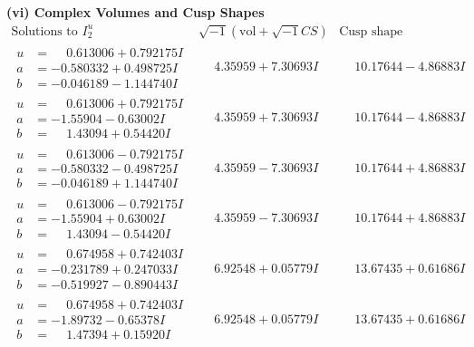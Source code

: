 \documentclass[1p]{elsarticle_modified}
\theoremstyle{definition}
\newcommand{\I}{\sqrt{-1}}
\begin{document}
\newpage\flushleft \textbf{(vi) Complex Volumes and Cusp Shapes}
$$\begin{array}{c|c|c}  
\text{Solutions to }I^u_{2}& \I (\text{vol} + \sqrt{-1}CS) & \text{Cusp shape}\\
 \hline 
\begin{aligned}
u &= \phantom{-}0.613006 + 0.792175 I \\
a &= -0.580332 + 0.498725 I \\
b &= -0.046189 - 1.144740 I\end{aligned}
 & \phantom{-}4.35959 + 7.30693 I & \phantom{-}10.17644 - 4.86883 I \\ \hline\begin{aligned}
u &= \phantom{-}0.613006 + 0.792175 I \\
a &= -1.55904 - 0.63002 I \\
b &= \phantom{-}1.43094 + 0.54420 I\end{aligned}
 & \phantom{-}4.35959 + 7.30693 I & \phantom{-}10.17644 - 4.86883 I \\ \hline\begin{aligned}
u &= \phantom{-}0.613006 - 0.792175 I \\
a &= -0.580332 - 0.498725 I \\
b &= -0.046189 + 1.144740 I\end{aligned}
 & \phantom{-}4.35959 - 7.30693 I & \phantom{-}10.17644 + 4.86883 I \\ \hline\begin{aligned}
u &= \phantom{-}0.613006 - 0.792175 I \\
a &= -1.55904 + 0.63002 I \\
b &= \phantom{-}1.43094 - 0.54420 I\end{aligned}
 & \phantom{-}4.35959 - 7.30693 I & \phantom{-}10.17644 + 4.86883 I \\ \hline\begin{aligned}
u &= \phantom{-}0.674958 + 0.742403 I \\
a &= -0.231789 + 0.247033 I \\
b &= -0.519927 - 0.890443 I\end{aligned}
 & \phantom{-}6.92548 + 0.05779 I & \phantom{-}13.67435 + 0.61686 I \\ \hline\begin{aligned}
u &= \phantom{-}0.674958 + 0.742403 I \\
a &= -1.89732 - 0.65378 I \\
b &= \phantom{-}1.47394 + 0.15920 I\end{aligned}
 & \phantom{-}6.92548 + 0.05779 I & \phantom{-}13.67435 + 0.61686 I \\ \hline\begin{aligned}

\end{aligned}
\end{array}$$
\end{document}
